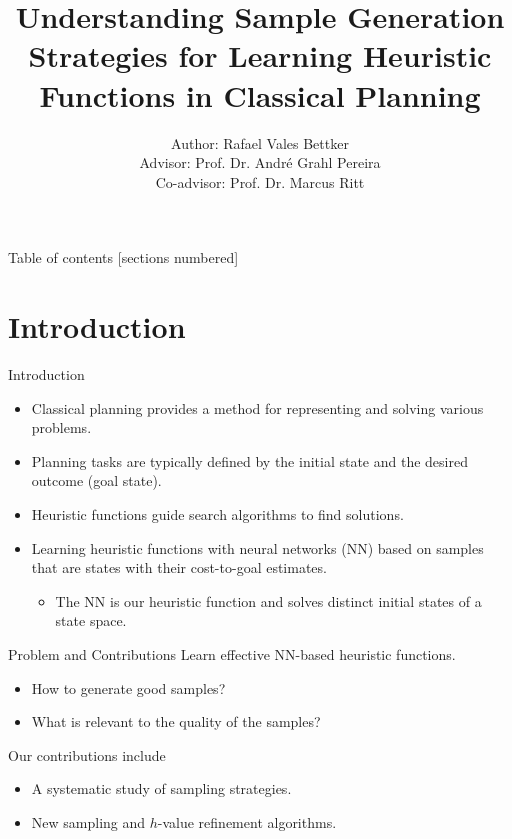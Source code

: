 \documentclass[10pt]{beamer}
\title{Understanding Sample Generation\\Strategies for Learning Heuristic\\Functions in Classical Planning}
\date{}
\author{Author: Rafael Vales Bettker\\Advisor: Prof. Dr. Andr\'{e} Grahl Pereira\\Co-advisor: Prof. Dr. Marcus Ritt}
\institute{Federal University of Rio Grande do Sul (UFRGS)\\Institute of Informatics\\Department of Theoretical Informatics}
\providecommand{\h}{\ensuremath{h}\xspace}
\begin{document}
\maketitle

\begin{frame}{Table of contents}
  [sections numbered]
  \tableofcontents[hideallsubsections]
\end{frame}

\section{Introduction}

\begin{frame}{Introduction}
\begin{itemize}
    \item Classical planning provides a method for representing and solving various problems.
    \item Planning tasks are typically defined by the initial state and the desired outcome (goal state).
    \item Heuristic functions guide search algorithms to find solutions.
    \item Learning heuristic functions with neural networks (NN) based on samples that are states with their cost-to-goal estimates.
    \begin{itemize}
        \item The NN is our \alert{heuristic function} and solves distinct initial states of a state space.
    \end{itemize}
\end{itemize}
\end{frame}

\begin{frame}{Problem and Contributions}
    Learn effective NN-based heuristic functions.
    \begin{itemize}
        \item How to generate good samples?
        \item What is relevant to the quality of the samples?
    \end{itemize}
    \bigskip
    \pause
    Our contributions include
    \begin{itemize}
        \item A systematic study of sampling strategies.
        \item New sampling and \h-value refinement algorithms.
    \end{itemize}
\end{frame}
\end{document}
